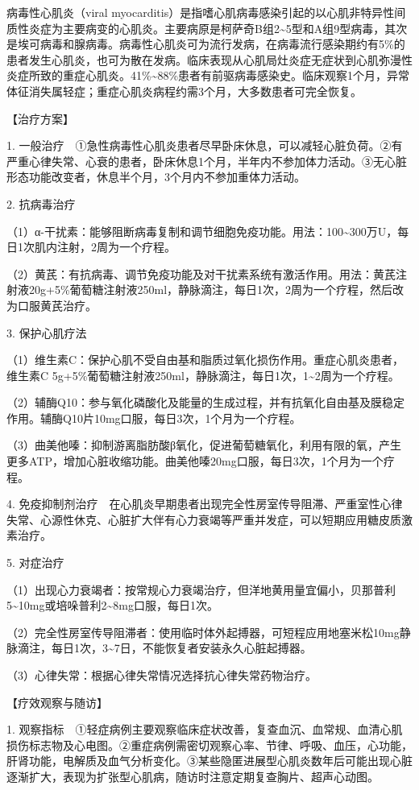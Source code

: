 病毒性心肌炎（viral
myocarditis）是指嗜心肌病毒感染引起的以心肌非特异性间质性炎症为主要病变的心肌炎。主要病原是柯萨奇B组2\textasciitilde{}5型和A组9型病毒，其次是埃可病毒和腺病毒。病毒性心肌炎可为流行发病，在病毒流行感染期约有5\%的患者发生心肌炎，也可为散在发病。临床表现从心肌局灶炎症无症状到心肌弥漫性炎症所致的重症心肌炎。41\%\textasciitilde{}88\%患者有前驱病毒感染史。临床观察1个月，异常体征消失属轻症；重症心肌炎病程约需3个月，大多数患者可完全恢复。

【治疗方案】

1.
一般治疗　①急性病毒性心肌炎患者尽早卧床休息，可以减轻心脏负荷。②有严重心律失常、心衰的患者，卧床休息1个月，半年内不参加体力活动。③无心脏形态功能改变者，休息半个月，3个月内不参加重体力活动。

2. 抗病毒治疗

（1）α-干扰素：能够阻断病毒复制和调节细胞免疫功能。用法：100\textasciitilde{}300万U，每日1次肌内注射，2周为一个疗程。

（2）黄芪：有抗病毒、调节免疫功能及对干扰素系统有激活作用。用法：黄芪注射液20g+5\%葡萄糖注射液250ml，静脉滴注，每日1次，2周为一个疗程，然后改为口服黄芪治疗。

3. 保护心肌疗法

（1）维生素C：保护心肌不受自由基和脂质过氧化损伤作用。重症心肌炎患者，维生素C
5g+5\%葡萄糖注射液250ml，静脉滴注，每日1次，1\textasciitilde{}2周为一个疗程。

（2）辅酶Q10：参与氧化磷酸化及能量的生成过程，并有抗氧化自由基及膜稳定作用。辅酶Q10片10mg口服，每日3次，1个月为一个疗程。

（3）曲美他嗪：抑制游离脂肪酸β氧化，促进葡萄糖氧化，利用有限的氧，产生更多ATP，增加心脏收缩功能。曲美他嗪20mg口服，每日3次，1个月为一个疗程。

4.
免疫抑制剂治疗　在心肌炎早期患者出现完全性房室传导阻滞、严重室性心律失常、心源性休克、心脏扩大伴有心力衰竭等严重并发症，可以短期应用糖皮质激素治疗。

5. 对症治疗

（1）出现心力衰竭者：按常规心力衰竭治疗，但洋地黄用量宜偏小，贝那普利5\textasciitilde{}10mg或培哚普利2\textasciitilde{}8mg口服，每日1次。

（2）完全性房室传导阻滞者：使用临时体外起搏器，可短程应用地塞米松10mg静脉滴注，每日1次，3\textasciitilde{}7日，不能恢复者安装永久心脏起搏器。

（3）心律失常：根据心律失常情况选择抗心律失常药物治疗。

【疗效观察与随访】

1.
观察指标　①轻症病例主要观察临床症状改善，复查血沉、血常规、血清心肌损伤标志物及心电图。②重症病例需密切观察心率、节律、呼吸、血压，心功能，肝肾功能，电解质及血气分析变化。③某些隐匿进展型心肌炎数年后可能出现心脏逐渐扩大，表现为扩张型心肌病，随访时注意定期复查胸片、超声心动图。

